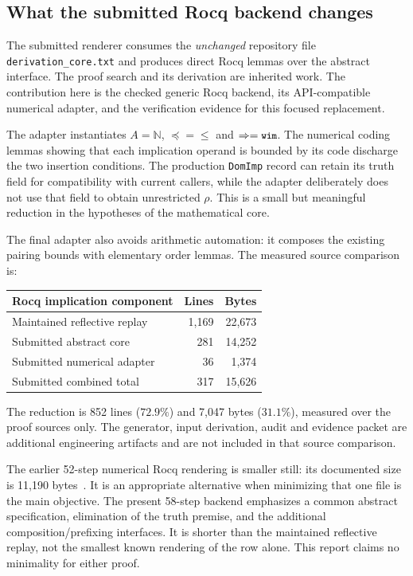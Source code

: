 \documentclass[11pt]{article}
\newcommand{\Nat}{\mathbb N}
\newcommand{\code}[1]{\texttt{\small #1}}
\begin{document}
\subsection{What the submitted Rocq backend changes}

The submitted renderer consumes the \emph{unchanged} repository file \code{derivation\_core.txt} and produces direct Rocq lemmas over the abstract interface. The proof search and its derivation are inherited work. The contribution here is the checked generic Rocq backend, its API-compatible numerical adapter, and the verification evidence for this focused replacement.

The adapter instantiates $A=\Nat$, $\preceq={\leq}$ and $\Rightarrow=\code{wim}$. The numerical coding lemmas showing that each implication operand is bounded by its code discharge the two insertion conditions. The production \code{DomImp} record can retain its truth field for compatibility with current callers, while the adapter deliberately does not use that field to obtain unrestricted $\rho$. This is a small but meaningful reduction in the hypotheses of the mathematical core.

The final adapter also avoids arithmetic automation: it composes the existing pairing bounds with elementary order lemmas. The measured source comparison is:
\begin{center}
\begin{tabular}{lrr}
\toprule
Rocq implication component & Lines & Bytes\\\midrule
Maintained reflective replay & 1,169 & 22,673\\
Submitted abstract core & 281 & 14,252\\
Submitted numerical adapter & 36 & 1,374\\
Submitted combined total & 317 & 15,626\\\bottomrule
\end{tabular}
\end{center}
The reduction is 852 lines ($72.9\%$) and 7,047 bytes ($31.1\%$), measured over the proof sources only. The generator, input derivation, audit and evidence packet are additional engineering artifacts and are not included in that source comparison.

The earlier 52-step numerical Rocq rendering is smaller still: its documented size is 11,190 bytes~\cite{cd}. It is an appropriate alternative when minimizing that one file is the main objective. The present 58-step backend emphasizes a common abstract specification, elimination of the truth premise, and the additional composition/prefixing interfaces. It is shorter than the maintained reflective replay, not the smallest known rendering of the row alone. This report claims no minimality for either proof.
\end{document}
